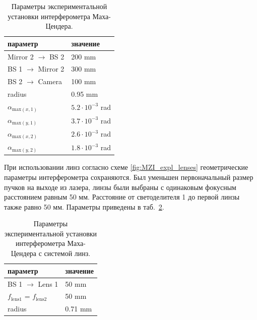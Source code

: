 \begin{table} [htbp]
    \centering
    \begin{threeparttable}
        \caption{Параметры экспериментальной установки интерферометра Маха-Цендера.}\label{tab:MZI_params}
        \begin{tabular}{| p{5cm} || p{5cm} |}
            \hline
            \hline
            параметр & значение \\
            \hline
            Mirror 2 $\to$ BS 2 & 200 mm\\
            BS 1 $\to$ Mirror 2 & 300 mm\\
            BS 2 $\to$ Camera & 100 mm\\
            radius & 0.95 mm\\
            $\alpha_{{\mathrm{max}}(x,1)}$ & $5.2 \cdot 10^{-3}$ rad\\
            $\alpha_{{\mathrm{max}}(y,1)}$ & $3.7 \cdot 10^{-3}$ rad\\
            $\alpha_{{\mathrm{max}}(x,2)}$ & $2.6 \cdot 10^{-3}$ rad\\
            $\alpha_{{\mathrm{max}}(y,2)}$ & $1.8 \cdot 10^{-3}$ rad\\
            \hline
            \hline
        \end{tabular}
    \end{threeparttable}
\end{table}

При использовании линз согласно схеме \ref{fig:MZI_expl_lenses} геометрические параметры интерферометра сохраняются. Был уменьшен первоначальный размер пучков на выходе из лазера, линзы были выбраны с одинаковым фокусным расстоянием равным 50 мм. Расстояние от светоделителя 1 до первой линзы также равно 50 мм. Параметры приведены в таб.~\ref{tab:MZI_lens_params}. 

\begin{table} [htbp]
    \centering
    \begin{threeparttable}
        \caption{Параметры экспериментальной установки интерферометра Маха-Цендера с системой линз.}\label{tab:MZI_lens_params}
        \begin{tabular}{| p{5cm} || p{5cm} |}
            \hline
            \hline
            параметр & значение \\
            \hline
            BS 1 $\to$ Lens 1 & 50 mm\\
            $f_{\mathrm{lens 1}}$ = $f_{\mathrm{lens 2}}$ & 50 mm\\
            radius & 0.71 mm\\
            \hline
            \hline
        \end{tabular}
    \end{threeparttable}
\end{table}

